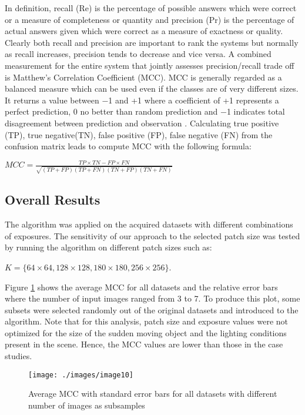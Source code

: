 \documentclass[preprint,12pt,3p]{elsarticle}
\begin{document}
In definition, recall (Re) is the percentage of possible answers which were correct or a measure of completeness or quantity and precision (Pr) is the percentage of actual answers given which were correct as a measure of exactness or quality. Clearly both recall and precision are important to rank the systems but normally as recall increases, precision tends to decrease and vice versa. A combined measurement for the entire system that jointly assesses precision/recall trade off is Matthew’s Correlation Coefficient (MCC). MCC is generally regarded as a balanced measure which can be used even if the classes are of very different sizes. It returns a value between $-$1 and +1 where a coefficient of +1 represents a perfect prediction, 0 no better than random prediction and $-$1 indicates total disagreement between prediction and observation \cite{18}. Calculating true positive (TP), true negative(TN), false positive (FP), false negative (FN) from the confusion matrix leads to compute MCC with the following formula:

\begin{center}
$ MCC = \frac{TP \times TN - FP \times FN}{\sqrt{(TP+FP)(TP+FN)(TN+FP)(TN+FN)}}$
\end{center}


\subsection{Overall Results}
The algorithm was applied on the acquired datasets with different combinations of exposures. The sensitivity of our approach to the selected patch size was tested by running the algorithm on different patch sizes such as:
\begin{center}
 $K = \{64 \times 64, 128 \times 128, 180 \times 180, 256 \times 256 \} $.\\
\end{center}

Figure \ref{fig:image10} shows the average MCC for all datasets and the relative error bars where the number of input images ranged from 3 to 7. To produce this plot, some subsets were selected randomly out of the original datasets and introduced to the algorithm. Note that for this analysis, patch size and exposure values were not optimized for the size of the sudden moving object and the lighting conditions present in the scene. Hence, the MCC values are lower than those in the case studies. 

\begin{figure}[h]
\centering
\texttt{[image: ./images/image10]}
\caption{Average MCC with standard error bars for all datasets with different number of images as subsamples}
\label{fig:image10}
\end{figure}
\end{document}
